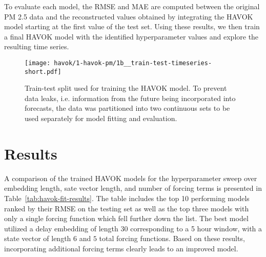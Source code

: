 To evaluate each model, the RMSE and MAE are computed between the original PM
2.5 data and the reconstructed values obtained by integrating the HAVOK model
starting at the first value of the test set. Using these results, we then train
a final HAVOK model with the identified hyperparameter values and explore the
resulting time series.

\begin{figure}[h]
  \centering
  \texttt{[image: havok/1-havok-pm/1b\_\_train-test-timeseries-short.pdf]}
  \caption{Train-test split used for training the HAVOK model. To prevent data
    leaks, i.e. information from the future being incorporated into forecasts,
    the data was partitioned into two continuous sets to be used separately for
    model fitting and evaluation.}
  \label{fig:pm-train-test-split}
\end{figure}

\section{Results}

A comparison of the trained HAVOK models for the hyperparameter sweep over
embedding length, sate vector length, and number of forcing terms is presented
in Table~\ref{tab:havok-fit-results}. The table includes the top 10 performing
models ranked by their RMSE on the testing set as well as the top three models
with only a single forcing function which fell further down the list. The best
model utilized a delay embedding of length $30$ corresponding to a 5 hour
window, with a state vector of length $6$ and $5$ total forcing functions. Based
on these results, incorporating additional forcing terms clearly leads to an
improved model.

